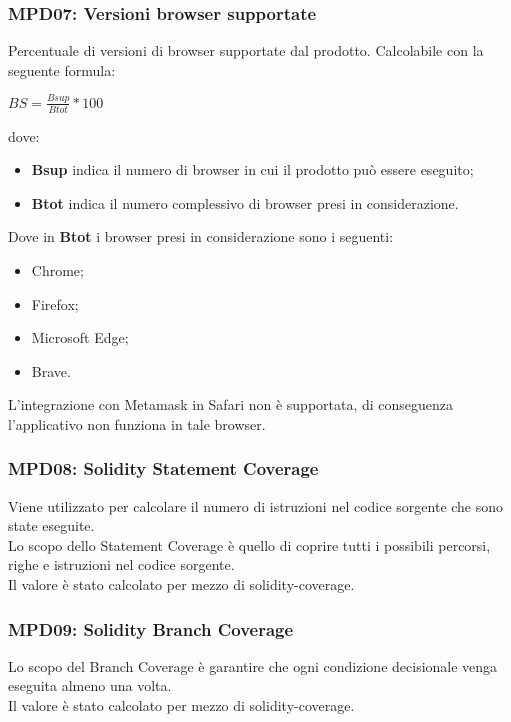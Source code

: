 \subsubsection{MPD07: Versioni browser supportate}\label{sssec:versioni_browser_supportate}
Percentuale di versioni di browser supportate dal prodotto.
Calcolabile con la seguente formula:
\begin{center}
    $BS = \displaystyle \frac{Bsup}{Btot}*100$
\end{center}
dove:
\begin{itemize}
    \item \textbf{Bsup} indica il numero di browser in cui il prodotto può essere eseguito;
    \item \textbf{Btot} indica il numero complessivo di browser presi in considerazione.
\end{itemize}
Dove in \textbf{Btot} i browser presi in considerazione sono i seguenti:
\begin{itemize}
    \item Chrome;
    \item Firefox;
    \item Microsoft Edge;
    \item Brave.
\end {itemize} 
L'integrazione con Metamask\glo{} in Safari non è supportata, di conseguenza l'applicativo non funziona in tale browser.

\subsubsection{MPD08: Solidity Statement Coverage}\label{sssec:solidity_statement_coverage}
Viene utilizzato per calcolare il numero di istruzioni nel codice sorgente che sono state eseguite.\\
Lo scopo dello Statement Coverage è quello di coprire tutti i possibili percorsi, righe e istruzioni nel codice sorgente.\\
Il valore è stato calcolato per mezzo di solidity-coverage.

\subsubsection{MPD09: Solidity Branch Coverage}\label{sssec:solidity_branch_coverage}
Lo scopo del Branch Coverage è garantire che ogni condizione decisionale venga eseguita almeno una volta.\\
Il valore è stato calcolato per mezzo di solidity-coverage.

